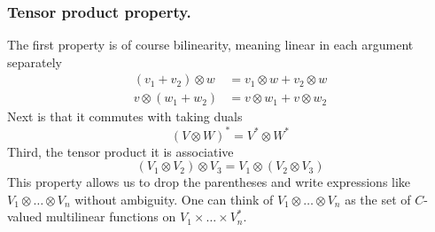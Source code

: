 \documentclass[../../../main.tex]{subfiles}
\begin{document}
\subsubsection{Tensor product property.}
The first property is of course bilinearity, meaning linear in each argument separately
\begin{align*}
  (v_1 + v_2) \otimes w & = v_1 \otimes w + v_2 \otimes w \\
  v \otimes (w_1 + w_2) & = v \otimes w_1 + v \otimes w_2
\end{align*}
Next is that it commutes with taking duals
\begin{equation*}
  (V \otimes W)^* = V^* \otimes W^*
\end{equation*}
Third, the tensor product it is associative
\begin{equation*}
  (V_1 \otimes V_2) \otimes V_3 = V_1 \otimes (V_2 \otimes V_3)
\end{equation*}
This property allows us to drop the parentheses and write expressions like $V_1 \otimes \dots \otimes V_n$ without ambiguity.
One can think of $V_1 \otimes \dots \otimes V_n$ as the set of $C$-valued multilinear functions on $V_1 \times \dots \times V_n ^*$.
\end{document}
